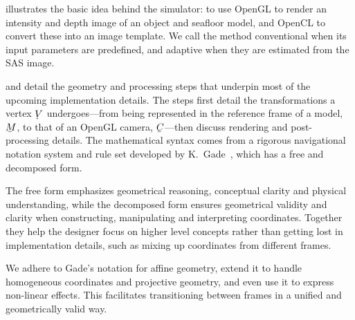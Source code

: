  illustrates the basic idea behind the simulator: to use OpenGL to render an intensity and depth image of an object and seafloor model, and OpenCL to convert these into an image template. We call the method conventional when its input parameters are predefined, and adaptive when they are estimated from the SAS image.



 and  detail the geometry and processing steps that underpin most of the upcoming implementation details. The steps first detail the transformations a vertex $\udot{V}$ undergoes---from being represented in the reference frame of a model, $\ubar{M}$, to that of an OpenGL camera, $\ubar{C}$---then discuss rendering and post-processing details. The mathematical syntax comes from a rigorous navigational notation system and rule set developed by K.~Gade~\cite{Gade2018}, which has a free and decomposed form.


The free form emphasizes geometrical reasoning, conceptual clarity and physical understanding, while the decomposed form ensures geometrical validity and clarity when constructing, manipulating and interpreting coordinates. Together they help the designer focus on higher level concepts rather than getting lost in implementation details, such as mixing up coordinates from different frames.%
%

We adhere to Gade's notation for affine geometry, extend it to handle homogeneous coordinates and projective geometry, and even use it to express non-linear effects. This facilitates transitioning between frames in a unified and geometrically valid way.




